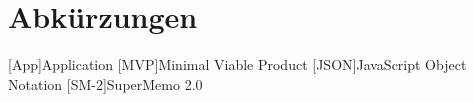 \chapter{Abkürzungen}\label{a:Abkuerzungen}

\begin{acronym}
    [App]{Application}
    [MVP]{Minimal Viable Product}
    [JSON]{JavaScript Object Notation}
    [SM-2]{SuperMemo 2.0}
\end{acronym}